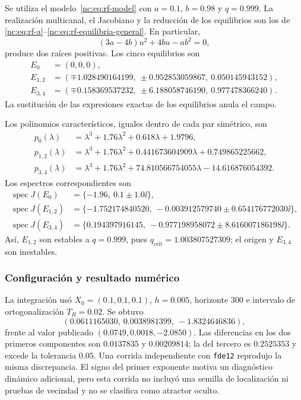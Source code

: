 Se utiliza el modelo~\eqref{nc:eq:rf-model} con \(a=0.1\), \(b=0.98\) y
\(q=0.999\). La realización multicanal, el Jacobiano y la reducción de los
equilibrios son los de
\eqref{nc:eq:rf-a}--\eqref{nc:eq:rf-equilibria-general}. En particular,
\begin{equation}
 (3a-4b)u^2+4bu-ab^2=0,
\end{equation}
produce dos raíces positivas. Los cinco equilibrios son
\begin{align}
 E_0&=(0,0,0),\\
 E_{1,2}&=(\mp1.028490164199,\ \pm0.952853059867,\ 0.050145943152),\\
 E_{3,4}&=(\mp0.158369537232,\ \pm6.188058746190,\ 0.977478366240).
\end{align}
La sustitución de las expresiones exactas de los equilibrios anula el campo.

Los polinomios característicos, iguales dentro de cada par simétrico, son
\begin{align}
 p_0(\lambda)&=\lambda^3+1.76\lambda^2+0.618\lambda+1.9796,\\
 p_{1,2}(\lambda)&=\lambda^3+1.76\lambda^2
 +0.441673604909\lambda+0.749865225662,\\
 p_{3,4}(\lambda)&=\lambda^3+1.76\lambda^2
 +74.810566754055\lambda-14.616876054392.
\end{align}
Los espectros correspondientes son
\begin{align}
 \operatorname{spec}J(E_0)&=
 \{-1.96,\ 0.1\pm1.0\ii\},\\
 \operatorname{spec}J(E_{1,2})&=
 \{-1.752174840520,\ -0.003912579740
 \pm0.654176772030\ii\},\\
 \operatorname{spec}J(E_{3,4})&=
 \{0.194397916145,\ -0.977198958072
 \pm8.616007186198\ii\}.
\end{align}
Así, \(E_{1,2}\) son estables a \(q=0.999\), pues
\(q_{\mathrm{crit}}=1.003807527309\); el origen y \(E_{3,4}\) son inestables.

\subsubsection*{Configuración y resultado numérico}

La integración usó \(X_0=(0.1,0.1,0.1)\), \(h=0.005\), horizonte \(300\) e
intervalo de ortogonalización \(T_R=0.02\). Se obtuvo
\begin{equation}
 (0.0611165030,\ 0.0038981399,\ -1.8324646836),
\end{equation}
frente al valor publicado \((0.0749,0.0018,-2.0850)\). Las diferencias en los
dos primeros componentes son \(0.0137835\) y \(0.00209814\); la del tercero es
\(0.2525353\) y excede la tolerancia \(0.05\). Una corrida independiente con
\texttt{fde12} reprodujo la misma discrepancia. El signo del primer exponente
motiva un diagnóstico dinámico adicional, pero esta corrida no incluyó una
semilla de localización ni pruebas de vecindad y no se clasifica como atractor
oculto.


